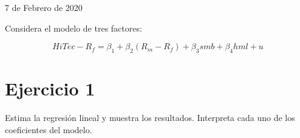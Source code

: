 \documentclass[12pt]{article}
\numberwithin{equation}{section} %
\begin{document}
\begin{titlepage}
	
	\vfill\vfill\vfill %
	
	{\large 7 de Febrero de 2020} %
	
	
	 
	
	\vfill %
	
\end{titlepage}


\clearpage
\tableofcontents
\clearpage


\setcounter{footnote}{0} %
\renewcommand*{\thefootnote}{\arabic{footnote}} %

Considera el modelo de tres factores:

$$HiTec − R_f = \beta_1 + \beta_2(R_m-R_f) + \beta_3smb + \beta_4hml + u$$

\section{Ejercicio 1} Estima la regresión lineal y muestra los resultados. Interpreta cada uno de los coeficientes del modelo.
\end{document}
